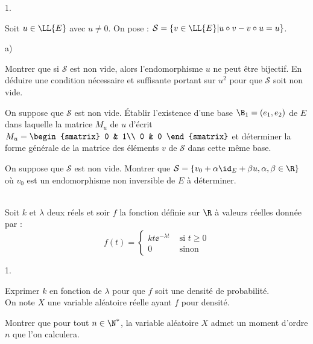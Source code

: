 \documentclass[11pt]{article}%
\begin{document}
\begin{exerciceAP}
\begin{noliste}{1.}
  \item Soit $u\in\LL{E}$ avec $u\neq 0$. On pose :
    $\mathcal{S}=\{v\in\LL{E} \vert u\circ v -v\circ u =u\}$.
    \begin{noliste}{a)}
    \setlength{\itemsep}{2mm}
    \item Montrer que si $\mathcal{S}$ est non vide, alors
      l'endomorphisme $u$ ne peut être bijectif. En déduire une
      condition nécessaire et suffisante portant sur $u^2$ pour que
      $\mathcal{S}$ soit non vide.
    \item On suppose que $\mathcal{S}$ est non vide. Établir
      l'existence d'une base $\B_1=(e_1,e_2)$ de $E$ dans laquelle la
      matrice $M_u$ de $u$ d'écrit $M_u = 
      \begin{smatrix} 
        0 & 1\\ 
        0 & 0
      \end{smatrix}$ et déterminer la forme générale de la matrice des
      éléments $v$ de $\mathcal{S}$ dans cette même base.
    \item On suppose que $\mathcal{S}$ est non vide. Montrer que
      $\mathcal{S}=\{v_0+\alpha \id_E+\beta u, \alpha, \beta\in\R\}$
      où $v_0$ est un endomorphisme non inversible de $E$ à
      déterminer.
    \end{noliste}
  \end{noliste}
\end{exerciceAP}


\begin{exerciceSP}~\\
  Soit $k$ et $\lambda$ deux réels et soir $f$ la fonction définie sur
  $\R$ à valeurs réelles donnée par :
  \[
  f(t)=\left\{
    \begin{array}{cl}
      kt\ee^{-\lambda t} & \mbox{ si $t\geq 0$}\\
      0 & \mbox{ sinon}
    \end{array}
  \right.
  \]
  \begin{noliste}{1.}
    \setlength{\itemsep}{2mm}
  \item Exprimer $k$ en fonction de $\lambda$ pour que $f$ soit une
    densité de probabilité.\\
    On note $X$ une variable aléatoire réelle ayant $f$ pour densité.
  \item Montrer que pour tout $n\in\N^*$, la variable aléatoire $X$
    admet un moment d'ordre $n$ que l'on calculera.
  \end{noliste}
\end{exerciceSP}
\end{document}
